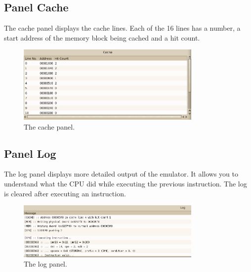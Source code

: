 \subsection{Panel Cache}
The cache panel displays the cache lines. Each of the 16 lines has a number, a start address of the memory block being cached and a hit count.
\begin{figure}[H]
\begin{center}
	\includegraphics[width=0.8\textwidth]{./files/emu_gui_cache.png}
\end{center}
	\caption{The cache panel.}
\end{figure}

\subsection{Panel Log}
The log panel displays more detailed output of the emulator. It allows you to understand what the CPU did while executing the previous instruction. The log is cleared after executing an instruction.
\begin{figure}[H]
\begin{center}
	\includegraphics[width=0.8\textwidth]{./files/emu_gui_log.png}
\end{center}
	\caption{The log panel.}
\end{figure}